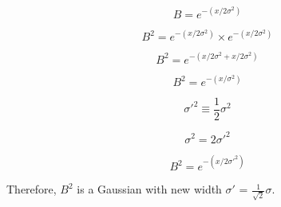 \documentclass[preprint]{aastex}
\begin{document}
\begin{equation}
B = e^{-(x/2\sigma^2)}
\end{equation}

\begin{equation}
B^2 = e^{-(x/2\sigma^2)} \times e^{-(x/2\sigma^2)}
\end{equation}

\begin{equation}
B^2 = e^{-(x/2\sigma^2 + x/2\sigma^2)}
\end{equation}

\begin{equation}
B^2 = e^{-(x/\sigma^2)}
\end{equation}

\begin{equation}
\sigma'^2 \equiv \frac{1}{2}\sigma^2
\end{equation}

\begin{equation}
\sigma^2 = 2\sigma'^2
\end{equation}

\begin{equation}
B^2 = e^{-(x/2\sigma'^2)}
\end{equation}

Therefore, $B^2$ is a Gaussian with new width $\sigma'$ = $\frac{1}{\sqrt{2}}\sigma$.
\end{document}
